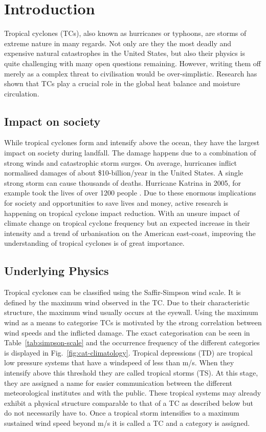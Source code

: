 \chapter{Introduction}\label{sec:introduction}
Tropical cyclones (TCs), also known as hurricanes or typhoons, are storms of extreme nature in many regards. Not only are they the most deadly and expensive natural catastrophes in the United States, but also their physics is quite challenging with many open questions remaining\cite{emanuel-summ}.
However, writing them off merely as a complex threat to civilisation would be over-simplistic. Research has shown that TCs play a crucial role in the global heat balance and moisture circulation\cite{moisture-transport}\cite{global-heat}.

\section{Impact on society}\label{sec:society}
While tropical cyclones form and intensify above the ocean, they have the largest impact on society during landfall. The damage happens due to a combination of strong winds and catastrophic storm surges. On average, hurricanes inflict normalised damages of about \$10-billion/year in the United States\cite{damage-norm}. A single strong storm can cause thousands of deaths. Hurricane Katrina in 2005, for example took the lives of over 1200 people \cite{hurr-2005}.
Due to these enormous implications for society and opportunities to save lives and money, active research is happening on tropical cyclone impact reduction. With an unsure impact of climate change on tropical cyclone frequency but an expected increase in their intensity and a trend of urbanisation on the American east-coast, improving the understanding of tropical cyclones is of great importance.

\section{Underlying Physics}\label{sec:physics}
Tropical cyclones can be classified using the Saffir-Simpson wind scale. It is defined by the maximum wind observed in the TC. Due to their characteristic structure, the maximum wind usually occurs at the eyewall. Using the maximum wind as a means to categorise TCs is motivated by the strong correlation between wind speeds and the inflicted damage\cite{simpson}. The exact categorisation can be seen in Table~\ref{tab:simpson-scale} and the occurrence frequency of the different categories is displayed in Fig.~\ref{fig:cat-climatology}. Tropical depressions (TD) are tropical low pressure systems that have a windspeed of less than \unit[17]{m/s}. When they intensify above this threshold they are called tropical storms (TS). At this stage, they are assigned a name for easier communication between the different meteorological institutes and with the public. These tropical systems may already exhibit a physical structure comparable to that of a TC as described below but do not necessarily have to. Once a tropical storm intensifies to a maximum sustained wind speed beyond \unit[33]{m/s} it is called a TC and a category is assigned.

